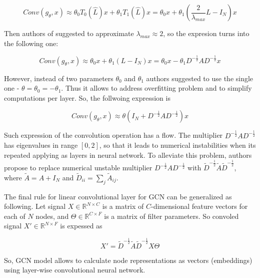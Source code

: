 \begin{equation}
    Conv(g_\theta,x) \approx {\theta}_0 T_0(\hat{L})x + {\theta}_1 T_1(\hat{L})x = {\theta}_0 x + {\theta}_1 (\frac{2}{\lambda_{max}}L-I_N)x
    \label{eq:gcn_conv_appr}
 \end{equation}

Then authors of \cite{GCN} suggested to approximate $\lambda_{max} \approx 2$, so the expresion turns into the following one:

\begin{equation}
    Conv(g_\theta,x) \approx {\theta}_0 x + {\theta}_1 (L-I_N)x = {\theta}_0 x - {\theta}_1 D^{-\frac{1}{2}}AD^{-\frac{1}{2}}x
    \label{eq:gcn_conv_appr2}
 \end{equation}

However, instead of two parameters $\theta_0$ and $\theta_1$ authors suggested to use the single one - $\theta = \theta_0 = -\theta_1$. Thus it allows to
address overfitting problem and to simplify computations per layer. So, the follwoing expression is


\begin{equation}
    Conv(g_\theta,x) \approx {\theta}(I_N + D^{-\frac{1}{2}}AD^{-\frac{1}{2}})x
    \label{eq:gcn_conv_appr3}
 \end{equation}

Such expression of the convolution operation has a flow. The multiplier  $D^{-\frac{1}{2}}AD^{-\frac{1}{2}}$ has eigenvalues in 
range $[0,2]$, so that it leads to numerical instabilities when its repeated applying as layers in neural network. To alleviate this
problem, authors propose to replace numerical unstable multiplier $D^{-\frac{1}{2}}AD^{-\frac{1}{2}}$
with $\tilde{D}^{-\frac{1}{2}}\tilde{A}\tilde{D}^{-\frac{1}{2}}$, where $\tilde{A}=A+I_N$ and $\tilde{D}_{ii}=\sum_{j}\tilde{A}_{ij}$.

The final rule for linear convolutional layer for GCN can be generalized as following. Let signal $X \in \mathbb{R}^{N\times C}$ is a matrix of $C$-dimensional
feature vectors for each of $N$ nodes, and $\Theta \in \mathbb{R}^{C \times F}$ is a matrix of filter parameters. So convoled signal $X' \in \mathbb{R}^{N \times F}$ is 
expessed as 

\begin{equation}
    X' = \tilde{D}^{-\frac{1}{2}}\tilde{A}\tilde{D}^{-\frac{1}{2}}X\Theta
    \label{eq:final_gcn}
\end{equation}

So, GCN model allows to calculate node representations as vectors (embeddings) using layer-wise convolutional neural network.

